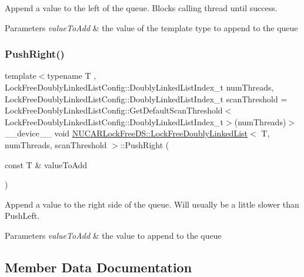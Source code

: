 Append a value to the left of the queue. Blocks calling thread until success. 
\begin{DoxyParams}{Parameters}
{\em value\+To\+Add} & the value of the template type to append to the queue \\
\hline
\end{DoxyParams}
\mbox{\label{class_n_u_c_a_r_lock_free_d_s_1_1_lock_free_doubly_linked_list_ab607c1fd1700fa9fac344561144e0698}} 
\subsubsection{\texorpdfstring{Push\+Right()}{PushRight()}}
{\footnotesize\ttfamily template$<$typename T , Lock\+Free\+Doubly\+Linked\+List\+Config\+::\+Doubly\+Linked\+List\+Index\+\_\+t num\+Threads, Lock\+Free\+Doubly\+Linked\+List\+Config\+::\+Doubly\+Linked\+List\+Index\+\_\+t scan\+Threshold = Lock\+Free\+Doubly\+Linked\+List\+Config\+::\+Get\+Default\+Scan\+Threshold$<$\+Lock\+Free\+Doubly\+Linked\+List\+Config\+::\+Doubly\+Linked\+List\+Index\+\_\+t$>$(num\+Threads)$>$ \\
\+\_\+\+\_\+device\+\_\+\+\_\+ void \mbox{\hyperlink{class_n_u_c_a_r_lock_free_d_s_1_1_lock_free_doubly_linked_list}{N\+U\+C\+A\+R\+Lock\+Free\+D\+S\+::\+Lock\+Free\+Doubly\+Linked\+List}}$<$ T, num\+Threads, scan\+Threshold $>$\+::Push\+Right (\begin{DoxyParamCaption}\item[{const T \&}]{value\+To\+Add }\end{DoxyParamCaption})\hspace{0.3cm}{\ttfamily [inline]}}

Append a value to the right side of the queue. Will usually be a little slower than Push\+Left. 
\begin{DoxyParams}{Parameters}
{\em value\+To\+Add} & the value to append to the queue \\
\hline
\end{DoxyParams}


\subsection{Member Data Documentation}
\mbox{\label{class_n_u_c_a_r_lock_free_d_s_1_1_lock_free_doubly_linked_list_a7b3c4526b9593afc237fc2e5f7934a15}} 
